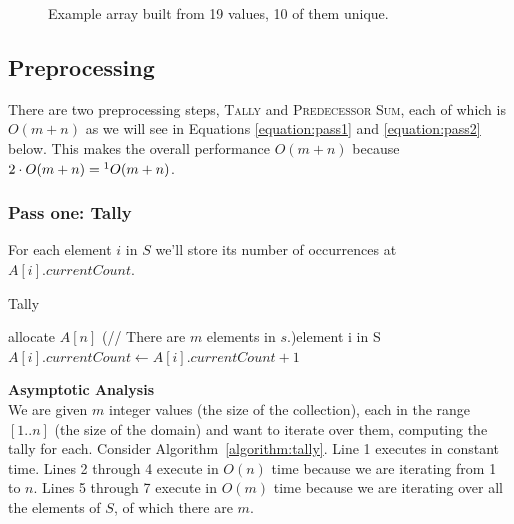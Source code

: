 \documentclass[letterpaper, 10pt,DIV=13]{scrartcl}
\numberwithin{equation}{section} %
\numberwithin{figure}{section} %
\numberwithin{table}{section} %
\begin{document}
\begin{figure}[ht] 
   \centering 
   \caption{Example array built from 19 values, 10 of them unique.}
   \label{figure:array}
\end{figure}

\subsection{Preprocessing}
There are two preprocessing steps, \textsc{Tally} and \textsc{Predecessor Sum}, each of which is $O(m+n)$ as we will see in Equations \ref{equation:pass1} and \ref{equation:pass2} below.
This makes the overall performance $O(m+n)$ because 
$2 \cdot O(m+n) =\footnote{This is an abuse of the notation, but if it's okay in the CLRS~\cite{clrs} book I hope it's okay here.} O(m+n)$.


\subsubsection{Pass one: Tally}
For each element $i$ in $S$ we'll store its number of occurrences at $A[i].currentCount$.

\begin{algorithm}[H]
    \SetAlgoLined
    \caption{Tally}
    \label{algorithm:tally}
   
    allocate $A[n]$\;
    \ForEach(// There are $m$ elements in $s$.){element i in S}{
         $A[i].currentCount \leftarrow A[i].currentCount + 1$\;
    }
\end{algorithm}

\textbf{Asymptotic Analysis} \\
We are given $m$ integer values (the size of the collection), each in the range $[1..n]$ (the size of the domain) and want to iterate over them, computing the tally for each.
Consider Algorithm~\ref{algorithm:tally}.
Line 1 executes in constant time.
Lines 2 through 4 execute in $O(n)$ time because we are iterating from 1 to $n$.  
Lines 5 through 7 execute in $O(m)$ time because we are iterating over all the elements of $S$, of which there are $m$.  
\end{document}
